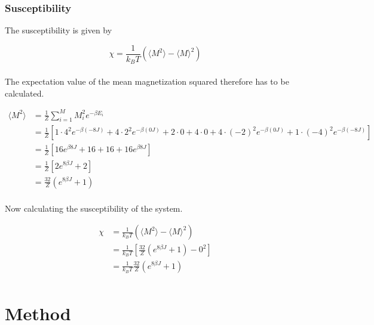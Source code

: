 \documentclass{article}
\begin{document}
\subsubsection{Susceptibility}

The susceptibility is given by

\begin{equation}    \label{eq:susceptibility}
    \chi = \frac{1}{k_B T} \left( \langle M^2 \rangle - \langle M \rangle ^2 \right)
\end{equation} \\

The expectation value of the mean magnetization squared therefore has to be calculated.

\begin{align*}
  \langle M^2 \rangle &= \frac{1}{Z} \sum _{i=1} ^M M_i^2 e^{- \beta E_i} \\
  &= \frac{1}{Z} \left[1 \cdot 4^2 e^{- \beta (-8J)} + 4 \cdot 2^2 e^{- \beta (0J)} + 2 \cdot 0 + 4 \cdot 0 + 4 \cdot (-2)^2 e^{- \beta (0J)} + 1 \cdot (-4)^2 e^{- \beta (-8J)} \right] \\
  &= \frac{1}{Z} \left[ 16 e^{\beta 8J} + 16 + 16 + 16 e^{ \beta 8J} \right] \\
  &= \frac{1}{Z} \left[ 2 e^{8 \beta J} + 2 \right] \\
  &= \frac{32}{Z} \left( e^{8 \beta J} + 1 \right) \\
\end{align*}

Now calculating the susceptibility of the system.

\begin{align*}
    \chi &= \frac{1}{k_B T} \left( \langle M^2 \rangle - \langle M \rangle ^2 \right) \\
    &= \frac{1}{k_B T} \left[ \frac{32}{Z} \left( e^{8 \beta J} + 1 \right) - 0^2 \right] \\
    &= \frac{1}{k_B T} \frac{32}{Z} \left( e^{8 \beta J} + 1 \right) \\
\end{align*}







\vspace{1cm}

\section{Method} \label{sec:Method}
\end{document}
